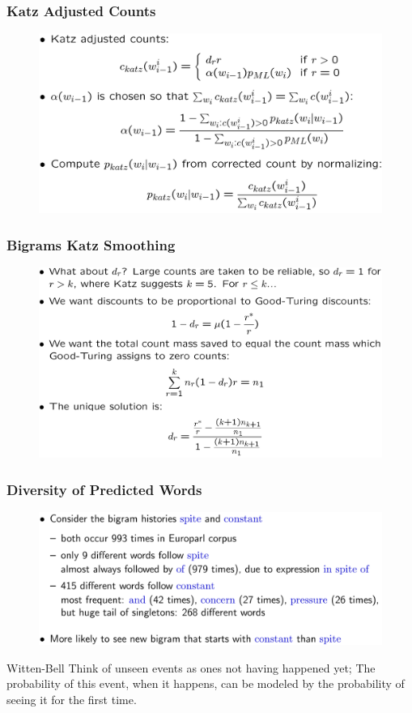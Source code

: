 \documentclass{beamer}
\begin{document}

\begin{frame}\frametitle{Katz Adjusted Counts}
\begin{figure}
\includegraphics[width=0.9\linewidth]{figure/katz_bigram.pdf}
\end{figure}
\end{frame}
\begin{frame}\frametitle{Bigrams Katz Smoothing}
\begin{figure}
\includegraphics[width=0.9\linewidth]{figure/katz_bigram_discounting.pdf}
\end{figure}
\end{frame}
\begin{frame}\frametitle{Diversity of Predicted Words}
\begin{figure}
\includegraphics[width=1\linewidth]{figure/predicted_words.pdf}
\end{figure}
\begin{block}{Witten-Bell}
Think of unseen events as ones not having
happened yet; The probability of this event, when it happens, can
be modeled by the probability of seeing it for the
first time.
\end{block}
\end{frame}
\end{document}
